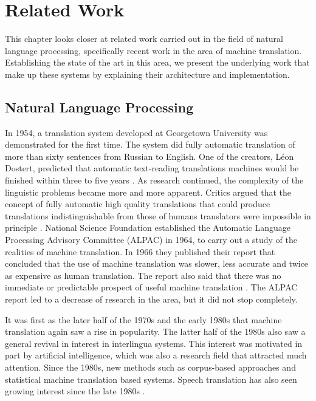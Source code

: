 
\chapter{Related Work}
\label{ch:related_work}
This chapter looks closer at related work carried out in the field of natural language processing, specifically recent work in the area of machine translation. Establishing the state of the art in this area, we present the underlying work that make up these systems by explaining their architecture and implementation.


\section{Natural Language Processing}
\label{sec:natural_language_processing}
In 1954, a translation system developed at Georgetown University was demonstrated for the first time. The system did fully automatic translation of more than sixty sentences from Russian to English. One of the creators, Léon Dostert, predicted that automatic text-reading translations machines would be finished within three to five years \citep{hutchins1997first}. As research continued, the complexity of the linguistic problems became more and more apparent. Critics argued that the concept of fully automatic high quality translations that could produce translations indistinguishable from those of humans translators were impossible in principle \citep{hutchins2007machine}. National Science Foundation established the Automatic Language Processing Advisory Committee (ALPAC) in 1964, to carry out a study of the realities of machine translation. In 1966 they published their report that concluded that the use of machine translation was slower, less accurate and twice as expensive as human translation. The report also said that there was no immediate or predictable prospect of useful machine translation \citep{hutchins2007machine, national1966language, koehn2010statistical}. The ALPAC report led to a decrease of research in the area, but it did not stop completely.

It was first as the later half of the 1970s and the early 1980s that machine translation again saw a rise in popularity. The latter half of the 1980s also saw a general revival in interest in interlingua systems. This interest was motivated in part by artificial intelligence, which was also a research field that attracted much attention. Since the 1980s, new methods such as corpus-based approaches and statistical machine translation based systems. Speech translation has also seen growing interest since the late 1980s \citep{hutchins2007machine}.

